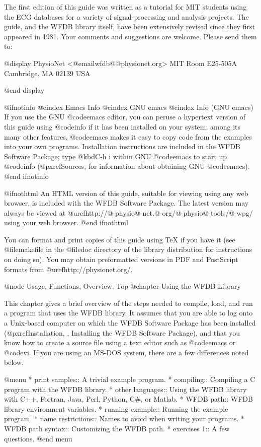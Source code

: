 The first edition of this guide was written as a tutorial for MIT
students using the ECG databases for a variety of signal-processing and
analysis projects.  The guide, and the WFDB library itself, have been
extensively revised since they first appeared in 1981.  Your comments
and suggestions are welcome.  Please send them to:

@display
PhysioNet  <@email{wfdb@@physionet.org}>
MIT Room E25-505A
Cambridge, MA 02139
USA

@end display

@ifnotinfo
@cindex Emacs Info
@cindex GNU emacs
@cindex Info (GNU emacs)
If you use the GNU @code{emacs} editor, you can peruse a hypertext
version of this guide using @code{info} if it has been installed on your
system; among its many other features, @code{emacs} makes it easy to
copy code from the examples into your own programs.  Installation
instructions are included in the WFDB Software Package; type @kbd{C-h i}
within GNU @code{emacs} to start up @code{info} (@pxref{Sources}, for
information about obtaining GNU @code{emacs}).
@end ifnotinfo

@ifnothtml
An HTML version of this guide, suitable for viewing using any web browser,
is included with the WFDB Software Package.  The latest version may always be
viewed at @uref{http://@-physio@-net.@-org/@-physio@-tools/@-wpg/} using your web
browser.
@end ifnothtml

You can format and print copies of this guide using TeX if you have it (see
@file{makefile} in the @file{doc} directory of the library distribution for
instructions on doing so).  You may obtain preformatted versions in PDF and
PostScript formats from @uref{http://physionet.org/}.


@node     Usage, Functions, Overview, Top
@chapter Using the WFDB Library

This chapter gives a brief overview of the steps needed to compile,
load, and run a program that uses the WFDB library.  It assumes that you
are able to log onto a Unix-based computer on which the WFDB Software
Package has been installed
(@pxref{Installation, , Installing the WFDB Software Package}),
and that you know how to create a source file using a text editor such
as @code{emacs} or @code{vi}.  If you are using an MS-DOS system, there
are a few differences noted below.


@menu
* print samples::		A trivial example program.
* compiling::			Compiling a C program with the WFDB library.
* other languages::             Using the WFDB library with C++, Fortran,
                                  Java, Perl, Python, C#, or Matlab.
* WFDB path::			WFDB library environment variables.
* running example::		Running the example program.
* name restrictions::		Names to avoid when writing your programs.
* WFDB path syntax::		Customizing the WFDB path.
* exercises 1::			A few questions.
@end menu

